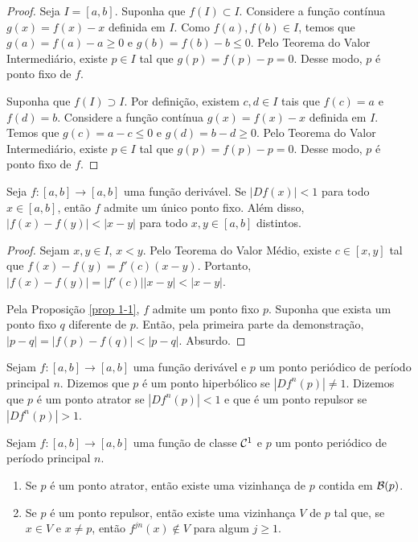 \begin{proof}
Seja $I = [a, b]$. Suponha que $f(I) \subset I$. Considere a função contínua $g(x) = f(x) - x$ definida em $I$. Como $f(a), f(b) \in I$, temos que $g(a) = f(a) - a \geq 0$ e $g(b) = f(b) - b \leq 0$. Pelo Teorema do Valor Intermediário, existe $p \in I$ tal que $g(p) = f(p) -p = 0$. Desse modo, $p$ é ponto fixo de $f$.

Suponha que $f(I) \supset I$. Por definição, existem $c, d \in I$ tais que $f(c) = a$ e$f(d) = b$. Considere a função contínua $g(x) = f(x) - x$ definida em $I$. Temos que $g(c) = a - c \leq 0$ e $g(d) = b - d \geq 0$. Pelo Teorema do Valor Intermediário, existe $p \in I$ tal que $g(p) = f(p) - p = 0$. Desse modo, $p$ é ponto fixo de $f$.
\end{proof}

\begin{theorem}
Seja $f:[a, b] \to [a, b]$ uma função derivável. Se $|Df(x)| < 1$ para todo $x \in [a, b]$, então $f$ admite um único ponto fixo. Além disso, $|f(x) - f(y)| < |x - y|$ para todo $x, y \in [a, b]$ distintos.
\end{theorem}

\begin{proof}
Sejam $x, y \in I$, $x < y$. Pelo Teorema do Valor Médio, existe $c \in [x, y]$ tal que $f(x) - f(y) = f'(c)(x - y)$. Portanto, $|f(x) - f(y)| = |f'(c)||x - y| < |x - y|$.

Pela Proposição \ref{prop 1-1}, $f$ admite um ponto fixo $p$. Suponha que exista um ponto fixo $q$ diferente de $p$. Então, pela primeira parte da demonstração, $|p - q| = |f(p) - f(q)| < |p - q|$. Absurdo.
\end{proof}

\begin{definition}
Sejam $f: [a, b] \to [a, b]$ uma função derivável e $p$ um ponto periódico de período principal $n$. Dizemos que $p$ é um ponto hiperbólico se $|Df^n(p)| \neq 1$. Dizemos que $p$ é um ponto atrator se $|Df^n(p)| < 1$ e que é um ponto repulsor se $|Df^n(p)| > 1$.
\end{definition}

\begin{theorem}
Sejam $f: [a, b] \to [a, b]$ uma função de classe $\mathcal{C}^1$ e $p$ um ponto periódico de período principal $n$.
\begin{enumerate}
\item Se $p$ é um ponto atrator, então existe uma vizinhança de $p$ contida em $\mathcal{B}(p)$.
\item Se $p$ é um ponto repulsor, então existe uma vizinhança $V$ de $p$ tal que, se $x \in V$ e $x \neq p$, então  $f^{jn}(x) \notin V$ para algum $j \geq 1$. 
\end{enumerate}
\end{theorem}

